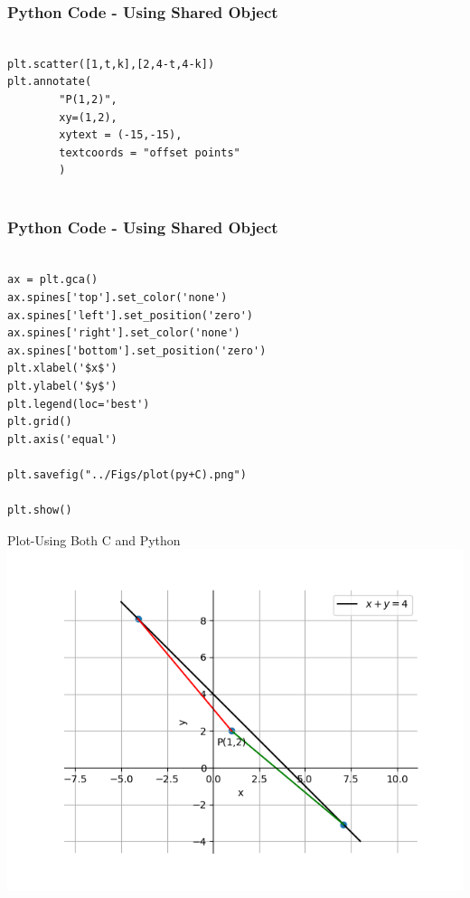\documentclass{beamer}
\begin{document}
\begin{frame}[fragile]
    \frametitle{Python Code - Using Shared Object}
    \begin{lstlisting}
    
plt.scatter([1,t,k],[2,4-t,4-k])
plt.annotate(
        "P(1,2)",
        xy=(1,2),
        xytext = (-15,-15),
        textcoords = "offset points"
        )


\end{lstlisting}
\end{frame}



\begin{frame}[fragile]
    \frametitle{Python Code - Using Shared Object}
    \begin{lstlisting}
    
ax = plt.gca()
ax.spines['top'].set_color('none')
ax.spines['left'].set_position('zero')
ax.spines['right'].set_color('none')
ax.spines['bottom'].set_position('zero')
plt.xlabel('$x$')
plt.ylabel('$y$')
plt.legend(loc='best')
plt.grid() 
plt.axis('equal')

plt.savefig("../Figs/plot(py+C).png")

plt.show()

\end{lstlisting}
\end{frame}

\begin{frame}{Plot-Using Both C and Python}
    \centering
    \includegraphics[width=\columnwidth, height=0.8\textheight, keepaspectratio]{Figs/plot(py+C).png}     
\end{frame}
\end{document}
